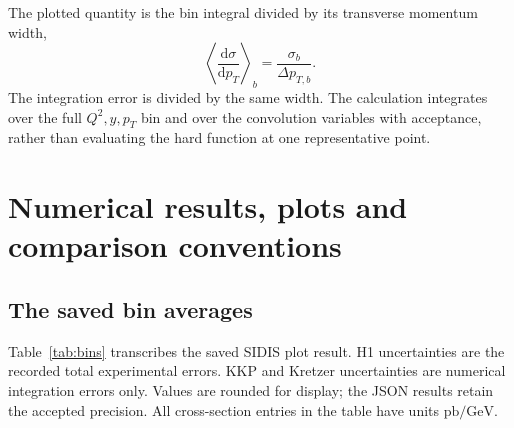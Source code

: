 \documentclass[11pt,a4paper]{article}
\newcommand{\dd}{\mathrm{d}}
\newcommand{\GeV}{\mathrm{GeV}}
\newcommand{\pb}{\mathrm{pb}}
\begin{document}
The plotted quantity is the bin integral divided by its transverse
momentum width,
\begin{equation}
 \left\langle\frac{\dd\sigma}{\dd p_T}\right\rangle_b
 =\frac{\sigma_b}{\Delta p_{T,b}}.
 \label{eq:binaverage}
\end{equation}
The integration error is divided by the same width. The calculation
integrates over the full $Q^2,y,p_T$ bin and over the convolution
variables with acceptance, rather than evaluating the hard function
at one representative point.

\section{Numerical results, plots and comparison conventions}
\label{sec:numresults}

\subsection{The saved bin averages}

Table~\ref{tab:bins} transcribes the saved SIDIS plot result. H1
uncertainties are the recorded total experimental errors. KKP and
Kretzer uncertainties are numerical integration errors only. Values
are rounded for display; the JSON results retain the accepted precision.
All cross-section entries in the table have units $\pb/\GeV$.
\end{document}
